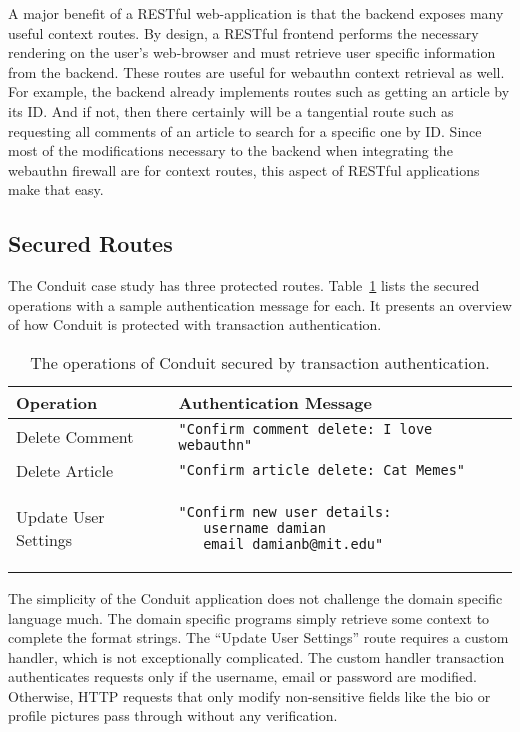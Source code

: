 A major benefit of a RESTful web-application is that the backend exposes many useful context routes. By design, a RESTful frontend performs the necessary rendering on the user's web-browser and must retrieve user specific information from the backend. These routes are useful for webauthn context retrieval as well. For example, the backend already implements routes such as getting an article by its ID. And if not, then there certainly will be a tangential route such as requesting all comments of an article to search for a specific one by ID. Since most of the modifications necessary to the backend when integrating the webauthn firewall are for context routes, this aspect of RESTful applications make that easy.

\subsection{Secured Routes}

The Conduit case study has three protected routes. Table~\ref{Table:ConduitSecuredRoutes} lists the secured operations with a sample authentication message for each. It presents an overview of how Conduit is protected with transaction authentication.

\begin{table}[h]
\centering

\begin{tabular}{ m{5cm} m{9cm}  } 
 \hline
 Operation & Authentication Message \\ 
 \hline \hline

 Delete Comment & \lstinline|"Confirm comment delete: I love webauthn"| \\ \hline

 Delete Article & \lstinline|"Confirm article delete: Cat Memes"| \\ \hline

 Update User Settings & 
 \begin{lstlisting} 
"Confirm new user details:
   username damian
   email damianb@mit.edu"
\end{lstlisting} 
\\ \hline

\end{tabular}
\caption{The operations of Conduit secured by transaction authentication.}
\label{Table:ConduitSecuredRoutes}
\end{table}

The simplicity of the Conduit application does not challenge the domain specific language much. The domain specific programs simply retrieve some context to complete the format strings. The ``Update User Settings'' route requires a custom handler, which is not exceptionally complicated. The custom handler transaction authenticates requests only if the username, email or password are modified. Otherwise, HTTP requests that only modify non-sensitive fields like the bio or profile pictures pass through without any verification.

